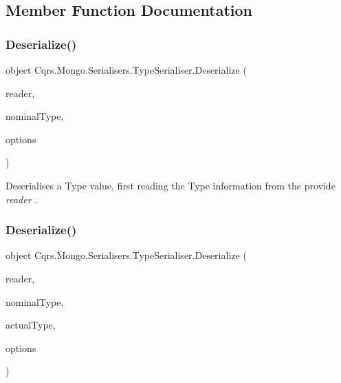 \subsection{Member Function Documentation}
\mbox{\label{classCqrs_1_1Mongo_1_1Serialisers_1_1TypeSerialiser_a38d61038bc9aab09572c9c05e8b9460b_a38d61038bc9aab09572c9c05e8b9460b}} 
\subsubsection{\texorpdfstring{Deserialize()}{Deserialize()}\hspace{0.1cm}{\footnotesize\ttfamily [1/2]}}
{\footnotesize\ttfamily object Cqrs.\+Mongo.\+Serialisers.\+Type\+Serialiser.\+Deserialize (\begin{DoxyParamCaption}\item[{Bson\+Reader}]{reader,  }\item[{Type}]{nominal\+Type,  }\item[{I\+Bson\+Serialization\+Options}]{options }\end{DoxyParamCaption})}



Deserialises a Type value, first reading the Type information from the provide {\itshape reader} . 

\mbox{\label{classCqrs_1_1Mongo_1_1Serialisers_1_1TypeSerialiser_aca73371a2a3ddd291d023584cb676ed3_aca73371a2a3ddd291d023584cb676ed3}} 
\subsubsection{\texorpdfstring{Deserialize()}{Deserialize()}\hspace{0.1cm}{\footnotesize\ttfamily [2/2]}}
{\footnotesize\ttfamily object Cqrs.\+Mongo.\+Serialisers.\+Type\+Serialiser.\+Deserialize (\begin{DoxyParamCaption}\item[{Bson\+Reader}]{reader,  }\item[{Type}]{nominal\+Type,  }\item[{Type}]{actual\+Type,  }\item[{I\+Bson\+Serialization\+Options}]{options }\end{DoxyParamCaption})}



